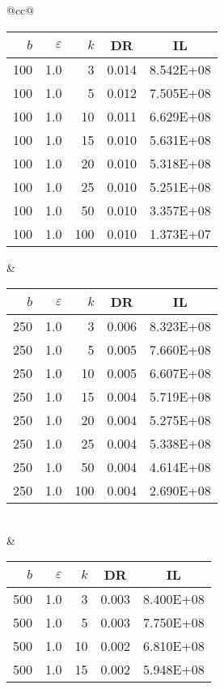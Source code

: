 \begin{table}[H]
	\centering
	\begin{tabular}{@{}cc@{}}
		\begin{tabular}{@{}rrrrr@{}}
			\toprule
			$b$ & $\varepsilon$ & $k$ & \multicolumn{1}{c}{DR} & \multicolumn{1}{c}{IL} \\ \midrule
			100	&	1.0	&	3	&	0.014	&	8.542E+08 \\
			100	&	1.0	&	5	&	0.012	&	7.505E+08 \\
			100	&	1.0	&	10	&	0.011	&	6.629E+08 \\
			100	&	1.0	&	15	&	0.010	&	5.631E+08 \\
			100	&	1.0	&	20	&	0.010	&	5.318E+08 \\
			100	&	1.0	&	25	&	0.010	&	5.251E+08 \\
			100	&	1.0	&	50	&	0.010	&	3.357E+08 \\
			100	&	1.0	&	100	&	0.010	&	1.373E+07 \\
		\end{tabular}
		&
		\begin{tabular}{@{}rrrrr@{}}
			\toprule
			$b$ & $\varepsilon$ & $k$ & \multicolumn{1}{c}{DR} & \multicolumn{1}{c}{IL} \\ \midrule
			250	&	1.0	&	3	&	0.006	&	8.323E+08 \\
			250	&	1.0	&	5	&	0.005	&	7.660E+08 \\
			250	&	1.0	&	10	&	0.005	&	6.607E+08 \\
			250	&	1.0	&	15	&	0.004	&	5.719E+08 \\
			250	&	1.0	&	20	&	0.004	&	5.275E+08 \\
			250	&	1.0	&	25	&	0.004	&	5.338E+08 \\
			250	&	1.0	&	50	&	0.004	&	4.614E+08 \\
			250	&	1.0	&	100	&	0.004	&	2.690E+08 \\
		\end{tabular}
		\\ & \\
		\begin{tabular}{@{}rrrrr@{}}
			\toprule
			$b$ & $\varepsilon$ & $k$ & \multicolumn{1}{c}{DR} & \multicolumn{1}{c}{IL} \\ \midrule
			500	&	1.0	&	3	&	0.003	&	8.400E+08 \\
			500	&	1.0	&	5	&	0.003	&	7.750E+08 \\
			500	&	1.0	&	10	&	0.002	&	6.810E+08 \\
			500	&	1.0	&	15	&	0.002	&	5.948E+08 \\

\end{tabular}
\end{tabular}
\end{table}
